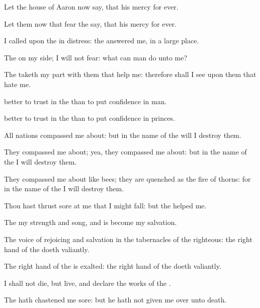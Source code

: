{\par }{\Q {}Let the
house of
Aaron now
say, that his
mercy
{} for
ever.


\par }{\Q {}Let them now that
fear the
{}
say, that his
mercy
{} for
ever.


\par }{\Q {}I
called upon the
{} in
distress: the
{}
answered me,
{} in a large
place.


\par }{\Q {}The
{}
{} on my side; I will not
fear: what
can
man
do unto me?


\par }{\Q {}The
{} taketh my part with them that
help me: therefore shall I
see
{} upon them that
hate me.


\par }{\Q {}
better to
trust in the
{} than to put
confidence in
man.


\par }{\Q {}
better to
trust in the
{} than to put
confidence in
princes.


\par }{\Q {}All
nations compassed me
about: but in the
name of the
{} will I
destroy them.


\par }{\Q {}They compassed me
about; yea, they compassed me
about: but in the
name of the
{} I will
destroy them.


\par }{\Q {}They compassed me
about like
bees; they are
quenched as the
fire of
thorns: for in the
name of the
{} I will
destroy them.


\par }{\Q {}Thou hast
thrust
sore at me that I might
fall: but the
{}
helped me.


\par }{\Q {}The
{}
{} my
strength and
song, and is become my
salvation.


\par }{\Q {}The
voice of
rejoicing and
salvation
{} in the
tabernacles of the
righteous: the right
hand of the
{}
doeth
valiantly.


\par }{\Q {}The right
hand of the
{} is
exalted: the right
hand of the
{}
doeth
valiantly.


\par }{\Q {}I shall not
die, but
live, and
declare the
works of the
{}.


\par }{\Q {}The
{} hath
chastened me
sore: but he hath not given me
over unto
death.


\par }{\BB \par }
